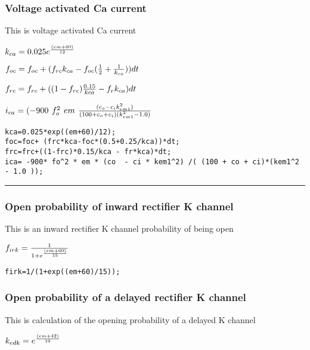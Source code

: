 \documentclass[11pt]{article}
\begin{document}
    \subsubsection{Voltage activated Ca
current}\label{voltage-activated-ca-current}

This is voltage activated Ca current

    \(\large{k_{ca} = 0.025 e^{\frac{(em+60)}{12}}}\)

\(\large{f_{oc} = f_{oc} +(f_{rc} k_{ca}-f_{oc}(\frac{1}{2}+\frac{1}{k_{ca}}))dt}\)

\(\large{f_{rc} = f_{rc} +((1-f_{rc})\frac{0.15}{k{ca}}-f_{r}k_{ca})dt}\)

\(\large{i_{ca} = (-900~f_o^{2}~em~\frac{(c_o-c_ik_{em1}^2)}{(100+c_o+c_i)(k_{em1}^2-1.0)}}\)

    \begin{verbatim}
kca=0.025*exp((em+60)/12);
foc=foc+ (frc*kca-foc*(0.5+0.25/kca))*dt;
frc=frc+((1-frc)*0.15/kca - fr*kca)*dt;
ica= -900* fo^2 * em * (co  - ci * kem1^2) /( (100 + co + ci)*(kem1^2 - 1.0 ));
\end{verbatim}

    \begin{center}\rule{0.5\linewidth}{\linethickness}\end{center}

    \subsubsection{Open probability of inward rectifier K
channel}\label{open-probability-of-inward-rectifier-k-channel}

This is an inward rectifier K channel probability of being open

    \(\large{f_{irk}} = \frac{1}{1+e^\frac{(em+60)}{15}}\)

    \begin{verbatim}
firk=1/(1+exp((em+60)/15));
\end{verbatim}

    \subsubsection{Open probability of a delayed rectifier K
channel}\label{open-probability-of-a-delayed-rectifier-k-channel}

This is calculation of the opening probability of a delayed K channel

    \(\large k_{edk} = e^\frac{(em+42)}{10}\)
\end{document}
